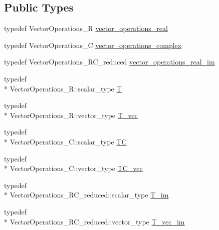\subsection*{Public Types}
\begin{DoxyCompactItemize}
\item 
typedef Vector\-Operations\-\_\-\-R \hyperlink{classnonlinear__operators_1_1Kuramoto__Sivashinskiy__2D_aeb1b50af221ad1f1ae0e8e945de23572}{vector\-\_\-operations\-\_\-real}
\item 
typedef Vector\-Operations\-\_\-\-C \hyperlink{classnonlinear__operators_1_1Kuramoto__Sivashinskiy__2D_a4868b14c92e357e368f38f421bd36a08}{vector\-\_\-operations\-\_\-complex}
\item 
typedef Vector\-Operations\-\_\-\-R\-C\-\_\-reduced \hyperlink{classnonlinear__operators_1_1Kuramoto__Sivashinskiy__2D_a26d633d58985865afc2bc593fcac3f46}{vector\-\_\-operations\-\_\-real\-\_\-im}
\item 
typedef \\*
Vector\-Operations\-\_\-\-R\-::scalar\-\_\-type \hyperlink{classnonlinear__operators_1_1Kuramoto__Sivashinskiy__2D_a108220178ea58555cba481a0c8960404}{T}
\item 
typedef \\*
Vector\-Operations\-\_\-\-R\-::vector\-\_\-type \hyperlink{classnonlinear__operators_1_1Kuramoto__Sivashinskiy__2D_ab3ac2eb04396d928f24edd66d2b9f37d}{T\-\_\-vec}
\item 
typedef \\*
Vector\-Operations\-\_\-\-C\-::scalar\-\_\-type \hyperlink{classnonlinear__operators_1_1Kuramoto__Sivashinskiy__2D_a293631e4e9624989416db9d9e74242ad}{T\-C}
\item 
typedef \\*
Vector\-Operations\-\_\-\-C\-::vector\-\_\-type \hyperlink{classnonlinear__operators_1_1Kuramoto__Sivashinskiy__2D_aa13f36a5401128a6e8b17a1676edb919}{T\-C\-\_\-vec}
\item 
typedef \\*
Vector\-Operations\-\_\-\-R\-C\-\_\-reduced\-::scalar\-\_\-type \hyperlink{classnonlinear__operators_1_1Kuramoto__Sivashinskiy__2D_afa96a5432720d8e643e6bec9bc89cd1a}{T\-\_\-im}
\item 
typedef \\*
Vector\-Operations\-\_\-\-R\-C\-\_\-reduced\-::vector\-\_\-type \hyperlink{classnonlinear__operators_1_1Kuramoto__Sivashinskiy__2D_a77c514db154eff62f7fbc39f78426f4d}{T\-\_\-vec\-\_\-im}
\end{DoxyCompactItemize}
